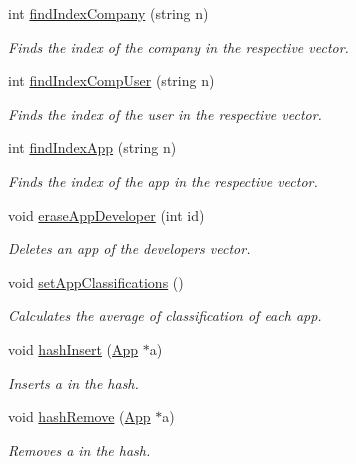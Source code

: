 \begin{DoxyCompactItemize}
int \hyperlink{class_app_store_a6079f5467d811db32ecb60fac8e8aeaa}{find\-Index\-Company} (string n)
\begin{DoxyCompactList}\small\item\em Finds the index of the company in the respective vector. \end{DoxyCompactList}\item 
int \hyperlink{class_app_store_a872607cf250dd86d8566f8ed60a0b074}{find\-Index\-Comp\-User} (string n)
\begin{DoxyCompactList}\small\item\em Finds the index of the user in the respective vector. \end{DoxyCompactList}\item 
int \hyperlink{class_app_store_a20ab97effcf3ec46466b2e1cd08ab22f}{find\-Index\-App} (string n)
\begin{DoxyCompactList}\small\item\em Finds the index of the app in the respective vector. \end{DoxyCompactList}\item 
void \hyperlink{class_app_store_ad2da0413449f62341ab662b877c2a0dd}{erase\-App\-Developer} (int id)
\begin{DoxyCompactList}\small\item\em Deletes an app of the developers vector. \end{DoxyCompactList}\item 
void \hyperlink{class_app_store_a4e231329bc5d40d61ebb356bb9157213}{set\-App\-Classifications} ()
\begin{DoxyCompactList}\small\item\em Calculates the average of classification of each app. \end{DoxyCompactList}\item 
void \hyperlink{class_app_store_a759b4aab67d3d70a2458cce8b7c67347}{hash\-Insert} (\hyperlink{class_app}{App} $\ast$a)
\begin{DoxyCompactList}\small\item\em Inserts a in the hash. \end{DoxyCompactList}\item 
void \hyperlink{class_app_store_aa9a916366ddeb52170198c8d5ed3c1f8}{hash\-Remove} (\hyperlink{class_app}{App} $\ast$a)
\begin{DoxyCompactList}\small\item\em Removes a in the hash. \end{DoxyCompactList}\item 

\end{DoxyCompactItemize}
